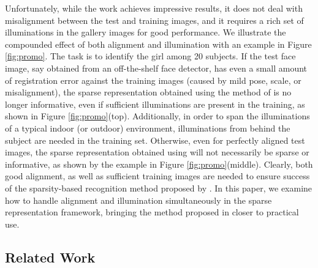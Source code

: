 \documentclass[12pt,journal,draftcls,letterpaper,onecolumn]{IEEEtran}
\begin{document}
Unfortunately, while the work \cite{Wright2009-PAMI} achieves impressive results, it does not deal with misalignment
between the test and training images, and it requires a rich set of illuminations
in the gallery images for good performance.  
We illustrate the compounded effect of both alignment and illumination 
with an example in Figure \ref{fig:promo}.
The task is to identify the girl among 20 subjects. If the test
face image, say obtained from an off-the-shelf face detector,
has even a small amount of registration error against the
training images (caused by mild pose, scale, or misalignment),
the sparse representation obtained using the method of \cite{Wright2009-PAMI} is no longer informative, 
even if sufficient illuminations are present in the training, as shown in Figure
\ref{fig:promo}(top). Additionally, in order to span
the illuminations of a typical indoor (or outdoor) environment,
illuminations from behind the subject are needed in the
training set. Otherwise, even for perfectly aligned test images,
the sparse representation obtained using \cite{Wright2009-PAMI} will not necessarily be sparse or
informative, as shown by the example in Figure
\ref{fig:promo}(middle). Clearly, both good alignment, as well
as sufficient training images are needed to ensure success of the sparsity-based 
recognition method proposed by \cite{Wright2009-PAMI}.  
In this paper, we examine how to handle alignment and illumination simultaneously
in the sparse representation framework, bringing the method proposed in \cite{Wright2009-PAMI}
closer to practical use.

\subsection{Related Work}
\end{document}
